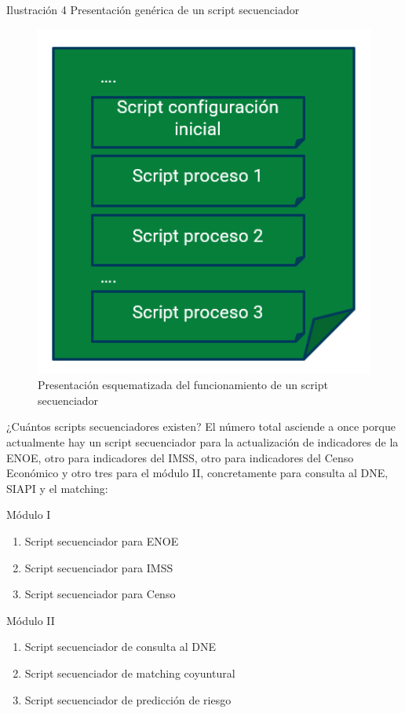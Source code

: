 \documentclass[
]{article}
\begin{document}
Ilustración 4 Presentación genérica de un script secuenciador

\begin{figure}
\includegraphics[width=5.46in]{images-1/02/scriptsecuenciador} \caption{Presentación esquematizada del funcionamiento de un script secuenciador}\label{fig:scriptsecuenciador}
\end{figure}

¿Cuántos scripts secuenciadores existen? El número total asciende a once porque actualmente hay un script secuenciador para la actualización de indicadores de la ENOE, otro para indicadores del IMSS, otro para indicadores del Censo Económico y otro tres para el módulo II, concretamente para consulta al DNE, SIAPI y el matching:

Módulo I

\begin{enumerate}
\def\labelenumi{\arabic{enumi})}
\item
  Script secuenciador para ENOE
\item
  Script secuenciador para IMSS
\item
  Script secuenciador para Censo
\end{enumerate}

Módulo II

\begin{enumerate}
\def\labelenumi{\arabic{enumi})}
\setcounter{enumi}{3}
\item
  Script secuenciador de consulta al DNE
\item
  Script secuenciador de matching coyuntural
\item
  Script secuenciador de predicción de riesgo
\end{enumerate}
\end{document}
